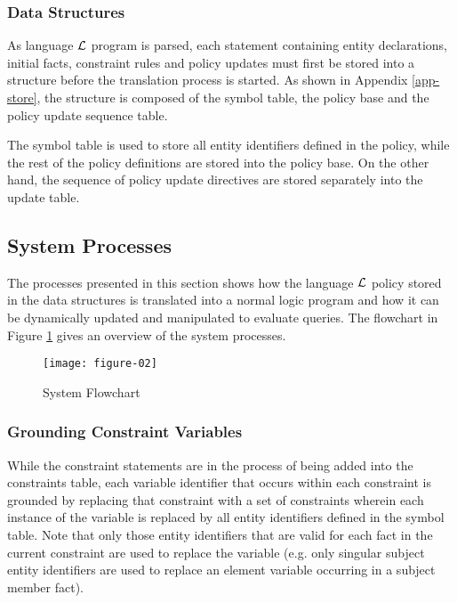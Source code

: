 \documentclass[global,twocolumn,final]{svjour}
\begin{document}
      \subsubsection{Data Structures}

        As language ${\cal L}$ program is parsed, each statement containing
        entity declarations, initial facts, constraint rules and policy
        updates must first be stored into a structure before the translation
        process is started. As shown in Appendix \ref{app-store}, the structure
        is composed of the symbol table, the policy base and the policy update
        sequence table.

        The symbol table is used to store all entity identifiers defined in the
        policy, while the rest of the policy definitions are stored into the
        policy base. On the other hand, the sequence of policy update
        directives are stored separately into the update table.

    \subsection{System Processes}

      The processes presented in this section shows how the language
      ${\cal L}$ policy stored in the data structures is translated into a
      normal logic program and how it can be dynamically updated and
      manipulated to evaluate queries. The flowchart in Figure \ref{fig-2}
      gives an overview of the system processes.

      \begin{figure}[ht]
        \begin{center}
          \texttt{[image: figure-02]}
          \caption{System Flowchart}
          \label{fig-2}
        \end{center}
      \end{figure}

      \subsubsection{Grounding Constraint Variables}

        While the constraint statements are in the process of being added into
        the constraints table, each variable identifier that occurs within each
        constraint is grounded by replacing that constraint with a set of
        constraints wherein each instance of the variable is replaced by all
        entity identifiers defined in the symbol table. Note that only those
        entity identifiers that are valid for each fact in the current
        constraint are used to replace the variable (e.g. only singular
        subject entity identifiers are used to replace an element variable
        occurring in a subject member fact).
\end{document}
